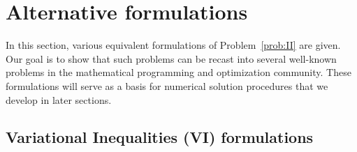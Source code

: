 {%







\clearpage
\section{Alternative formulations}
\label{sec:formulation}
In this section, various equivalent formulations of Problem~\ref{prob:II} are {given.
Our goal is to show that} such problems can be recast into several well-known problems in the mathematical programming and optimization community.
These formulations will serve as a basis for numerical solution procedures that we develop in later sections.

\subsection{Variational Inequalities (VI) formulations}

}
